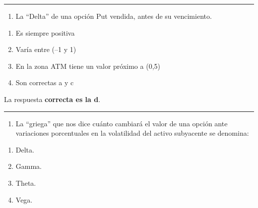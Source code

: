 \documentclass[
  letterpaper,
  DIV=11,
  numbers=noendperiod]{scrreprt}
\providecommand{\tightlist}{%
  \setlength{\itemsep}{0pt}\setlength{\parskip}{0pt}}\usepackage{longtable,booktabs,array}
\begin{document}
\begin{center}\rule{0.5\linewidth}{0.5pt}\end{center}

\begin{enumerate}
\def\labelenumi{\arabic{enumi}.}
\setcounter{enumi}{35}
\tightlist
\item
  La ``Delta'' de una opción Put vendida, antes de su vencimiento.
\end{enumerate}

\begin{enumerate}
\def\labelenumi{\alph{enumi})}
\item
  Es siempre positiva
\item
  Varía entre (--1 y 1)
\item
  En la zona ATM tiene un valor próximo a (0,5)
\item
  Son correctas a y c
\end{enumerate}

\begin{tcolorbox}[enhanced jigsaw, left=2mm, opacityback=0, colback=white, breakable, arc=.35mm, bottomrule=.15mm, rightrule=.15mm, toprule=.15mm, leftrule=.75mm, colframe=quarto-callout-tip-color-frame]
\begin{minipage}[t]{5.5mm}
\textcolor{quarto-callout-tip-color}{\faLightbulb}
\end{minipage}%
\begin{minipage}[t]{\textwidth - 5.5mm}

La respuesta \textbf{correcta es la d}.

\end{minipage}%
\end{tcolorbox}

\begin{center}\rule{0.5\linewidth}{0.5pt}\end{center}

\begin{enumerate}
\def\labelenumi{\arabic{enumi}.}
\setcounter{enumi}{36}
\tightlist
\item
  La ``griega'' que nos dice cuánto cambiará el valor de una opción ante
  variaciones porcentuales en la volatilidad del activo subyacente se
  denomina:
\end{enumerate}

\begin{enumerate}
\def\labelenumi{\alph{enumi})}
\item
  Delta.
\item
  Gamma.
\item
  Theta.
\item
  Vega.
\end{enumerate}
\end{document}
